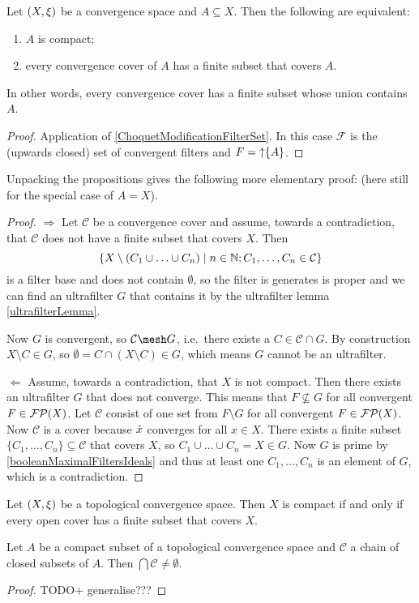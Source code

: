 \begin{proposition} \label{compactFiniteSubcover}
Let $\left( X,\xi \right)$ be a convergence space and $A\subseteq X$. Then the following are equivalent:
\begin{enumerate}
\item $A$ is compact;
\item every convergence cover of $A$ has a finite subset that covers $A$.
\end{enumerate}
\end{proposition}
In other words, every convergence cover has a finite subset whose union contains $A$.
\begin{proof}
Application of \ref{ChoquetModificationFilterSet}. In this case $\mathcal{F}$ is the (upwards closed) set of convergent filters and $F = \operatorname{\uparrow}\{A\}$.
\end{proof}
Unpacking the propositions gives the following more elementary proof: (here still for the special case of $A = X$).
\begin{proof}
$\boxed{\Rightarrow}$ Let $\mathcal{C}$ be a convergence cover and assume, towards a contradiction, that $\mathcal{C}$ does not have a finite subset that covers $X$. Then
\[ \setbuilder{X\setminus(C_1\cup \ldots \cup C_n)}{n\in \N; C_1,\ldots, C_n \in \mathcal{C}} \]
is a filter base and does not contain $\emptyset$, so the filter is generates is proper and we can find an ultrafilter $G$ that contains it by the ultrafilter lemma \ref{ultrafilterLemma}.

Now $G$ is convergent, so $\mathcal{C}\mesh G$, i.e.\ there exists a $C\in \mathcal{C}\cap G$. By construction $X\setminus C\in G$, so $\emptyset = C\cap (X\setminus C)\in G$, which means $G$ cannot be an ultrafilter.

$\boxed{\Leftarrow}$ Assume, towards a contradiction, that $X$ is not compact. Then there exists an ultrafilter $G$ that does not converge. This means that $F \not\subseteq G$ for all convergent $F\in\operatorname{\mathcal{FP}}(X)$. Let $\mathcal{C}$ consist of one set from $F\setminus G$ for all convergent $F\in\operatorname{\mathcal{FP}}(X)$. Now $\mathcal{C}$ is a cover because $\dot{x}$ converges for all $x\in X$. There exists a finite subset $\{C_1, \ldots, C_n\}\subseteq \mathcal{C}$ that covers $X$, so $C_1\cup \ldots \cup C_n = X \in G$. Now $G$ is prime by \ref{booleanMaximalFiltersIdeals} and thus at least one $C_1, \ldots, C_n$ is an element of $G$, which is a contradiction.
\end{proof}
\begin{corollary} \label{topologyCompactnessOpenCover}
Let $\left( X,\xi \right)$ be a topological convergence space. Then $X$ is compact \textup{if and only if} every open cover has a finite subset that covers $X$.
\end{corollary}
\begin{corollary}
Let $A$ be a compact subset of a topological convergence space and $\mathcal{C}$ a chain of closed subsets of $A$. Then $\bigcap \mathcal{C} \neq \emptyset$.
\end{corollary}
\begin{proof}
TODO+ generalise???
\end{proof}

